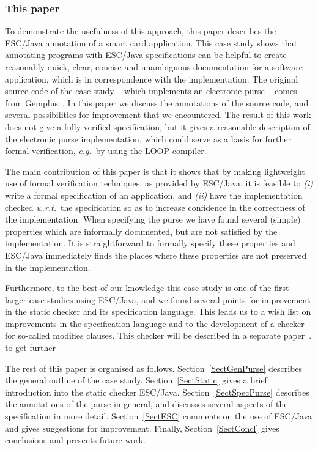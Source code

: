 \documentclass[a4paper]{llncs}
\begin{document}
\subsubsection{This paper}
To demonstrate the usefulness of this approach, this paper describes
the ESC/Java annotation of a smart card application. This case study
shows that annotating programs with ESC/Java specifications can be
helpful to create reasonably quick, clear, concise and unambiguous
documentation for a software application, which is in correspondence
with the implementation.  The original source code of the case study
-- which implements an electronic purse -- comes from
Gemplus~\cite{PurseUrl}. In this paper we discuss the annotations of
the source code, and several possibilities for improvement that we
encountered.  The result of this work does not give a fully verified
specification, but it gives a reasonable description of the electronic
purse implementation, which could serve as a basis for further formal
verification, \emph{e.g.}~by using the LOOP compiler.

The main contribution of this paper is that it shows that by making
light\-weight use of formal verification techniques, as provided by
ESC/Java, it is feasible to
\emph{(i)} write a formal specification of an application, and
\emph{(ii)} have the implementation checked \emph{w.r.t.}~the 
specification so as to increase confidence in the correctness of the
implementation. When specifying the purse we have found several
(simple) properties which are informally documented, but are not
satisfied by the implementation. It is straightforward to formally
specify these properties and ESC/Java immediately finds the places
where these properties are not preserved in the implementation.

Furthermore, to the best of our knowledge this case study is one of
the first larger case studies using ESC/Java, and we found several
points for improvement in the static checker and its specification
language. This leads us to a wish list on improvements in the
specification language and to the development of a checker for
so-called modifies clauses. This checker will be described in a
separate paper~\cite{CatanoH02b}.%
to get further

The rest of this paper is organised as
follows. Section~\ref{SectGenPurse} describes the general outline of
the case study. Section~\ref{SectStatic} gives a brief introduction
into the static checker ESC/Java.  Section~\ref{SectSpecPurse}
describes the annotations of the purse in general, and discusses
several aspects of the specification in more
detail. Section~\ref{SectESC} comments on the use of ESC/Java and
gives suggestions for improvement. Finally, Section~\ref{SectConcl}
gives conclusions and presents future work.
\end{document}
